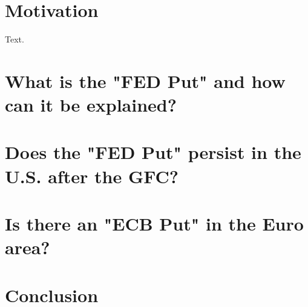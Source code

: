 
\chapter{Motivation}

Text.


\chapter{What is the "FED Put" and how can it be explained?}

\chapter{Does the "FED Put" persist in the U.S.  after the GFC?}

\chapter{Is there an "ECB Put" in the Euro area?}

\chapter{Conclusion}
